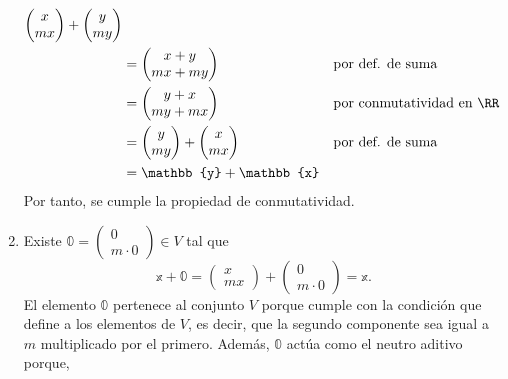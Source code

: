 \begin{examplebox}{}{}
\begin{enumerate}[label=\roman*), topsep=6pt, itemsep=0pt]
\begin{align*}
\begin{pmatrix}
                x \\
                mx
            \end{pmatrix} + \begin{pmatrix}
                y \\
                my
            \end{pmatrix} \\
            & = \begin{pmatrix}
                x + y \\
                mx + my
            \end{pmatrix} && \text{por def. de suma} \\
            & = \begin{pmatrix}
                y + x \\
                my + mx
            \end{pmatrix} && \text{por conmutatividad en $\RR$} \\
            & = \begin{pmatrix}
                y \\
                my
            \end{pmatrix} + \begin{pmatrix}
                x \\
                mx
            \end{pmatrix} && \text{por def. de suma} \\
            & = \mathbb{y} + \mathbb{x}
        \end{align*}
        Por tanto, se cumple la propiedad de conmutatividad.
        \item Existe $\mathbb{0} = \begin{pmatrix}
            0 \\
            m \cdot 0
        \end{pmatrix} \in V$ tal que
        $$\mathbb{x} + \mathbb{0} = \begin{pmatrix}
            x \\
            mx
        \end{pmatrix} + \begin{pmatrix}
            0 \\
            m \cdot 0
        \end{pmatrix} = \mathbb{x}.$$
        El elemento $\mathbb{0}$ pertenece al conjunto $V$ porque cumple con la condición que define a los elementos de $V$, es decir, que la segundo componente sea igual a $m$ multiplicado por el primero. Además, $\mathbb{0}$ actúa como el neutro aditivo porque,

\end{enumerate}
\end{examplebox}
